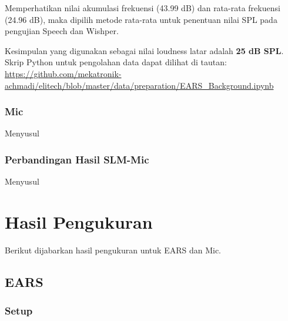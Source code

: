 \documentclass[12pt,]{article}
\begin{document}
	Memperhatikan nilai akumulasi frekuensi (43.99 dB) dan rata-rata frekuensi (24.96 dB),
	maka dipilih metode rata-rata untuk penentuan nilai SPL pada pengujian Speech dan Wishper.
	
	Kesimpulan yang digunakan sebagai nilai loudness latar adalah \textbf{25 dB SPL}.
	Skrip Python untuk pengolahan data dapat dilihat di tautan:\\
	\url{https://github.com/mekatronik-achmadi/elitech/blob/master/data/preparation/EARS_Background.ipynb}
	
	\subsubsection{Mic}
	
	Menyusul
	
	\subsubsection{Perbandingan Hasil SLM-Mic}
	
	Menyusul
	
	
	\newpage
	\section{Hasil Pengukuran}
	
	Berikut dijabarkan hasil pengukuran untuk EARS dan Mic.
	
	\subsection{EARS}
	
	\subsubsection{Setup}
	
\end{document}
